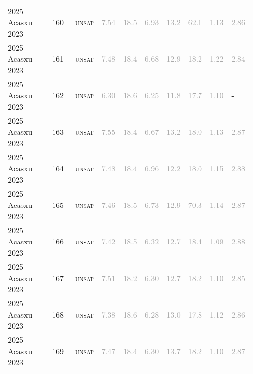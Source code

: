 \begin{center}
{\begin{longtable}{@{}llllllllll@{}}
2025 Acasxu 2023 & 160 & ~\textsc{unsat} & \textcolor{darkgray}{7.54} & \textcolor{darkgray}{18.5} & \textcolor{darkgray}{6.93} & \textcolor{darkgray}{13.2} & \textcolor{darkgray}{62.1} & \textcolor{darkgray}{1.13} & \textcolor{darkgray}{2.86} \\
2025 Acasxu 2023 & 161 & ~\textsc{unsat} & \textcolor{darkgray}{7.48} & \textcolor{darkgray}{18.4} & \textcolor{darkgray}{6.68} & \textcolor{darkgray}{12.9} & \textcolor{darkgray}{18.2} & \textcolor{darkgray}{1.22} & \textcolor{darkgray}{2.84} \\
2025 Acasxu 2023 & 162 & ~\textsc{unsat} & \textcolor{darkgray}{6.30} & \textcolor{darkgray}{18.6} & \textcolor{darkgray}{6.25} & \textcolor{darkgray}{11.8} & \textcolor{darkgray}{17.7} & \textcolor{darkgray}{1.10} & - \\
2025 Acasxu 2023 & 163 & ~\textsc{unsat} & \textcolor{darkgray}{7.55} & \textcolor{darkgray}{18.4} & \textcolor{darkgray}{6.67} & \textcolor{darkgray}{13.2} & \textcolor{darkgray}{18.0} & \textcolor{darkgray}{1.13} & \textcolor{darkgray}{2.87} \\
2025 Acasxu 2023 & 164 & ~\textsc{unsat} & \textcolor{darkgray}{7.48} & \textcolor{darkgray}{18.4} & \textcolor{darkgray}{6.96} & \textcolor{darkgray}{12.2} & \textcolor{darkgray}{18.0} & \textcolor{darkgray}{1.15} & \textcolor{darkgray}{2.88} \\
2025 Acasxu 2023 & 165 & ~\textsc{unsat} & \textcolor{darkgray}{7.46} & \textcolor{darkgray}{18.5} & \textcolor{darkgray}{6.73} & \textcolor{darkgray}{12.9} & \textcolor{darkgray}{70.3} & \textcolor{darkgray}{1.14} & \textcolor{darkgray}{2.87} \\
2025 Acasxu 2023 & 166 & ~\textsc{unsat} & \textcolor{darkgray}{7.42} & \textcolor{darkgray}{18.5} & \textcolor{darkgray}{6.32} & \textcolor{darkgray}{12.7} & \textcolor{darkgray}{18.4} & \textcolor{darkgray}{1.09} & \textcolor{darkgray}{2.88} \\
2025 Acasxu 2023 & 167 & ~\textsc{unsat} & \textcolor{darkgray}{7.51} & \textcolor{darkgray}{18.2} & \textcolor{darkgray}{6.30} & \textcolor{darkgray}{12.7} & \textcolor{darkgray}{18.2} & \textcolor{darkgray}{1.10} & \textcolor{darkgray}{2.85} \\
2025 Acasxu 2023 & 168 & ~\textsc{unsat} & \textcolor{darkgray}{7.38} & \textcolor{darkgray}{18.6} & \textcolor{darkgray}{6.28} & \textcolor{darkgray}{13.0} & \textcolor{darkgray}{17.8} & \textcolor{darkgray}{1.12} & \textcolor{darkgray}{2.86} \\
2025 Acasxu 2023 & 169 & ~\textsc{unsat} & \textcolor{darkgray}{7.47} & \textcolor{darkgray}{18.4} & \textcolor{darkgray}{6.30} & \textcolor{darkgray}{13.7} & \textcolor{darkgray}{18.2} & \textcolor{darkgray}{1.10} & \textcolor{darkgray}{2.87} \\

\end{longtable}}
\end{center}
